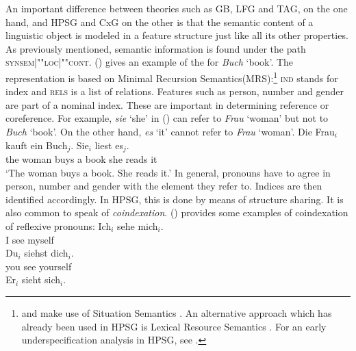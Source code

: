 An important difference between theories such as GB, LFG and TAG, on the one hand, and HPSG and CxG on the other is that the semantic content of a linguistic
object is modeled in a feature structure just like all its other properties. As previously mentioned, semantic information is found under the path
\textsc{synsem|""loc|""cont}. () gives an example of the \contv for \emph{Buch} `book'. The
representation is based on Minimal Recursion Semantics\indexmrs (MRS):\footnote{%
   \citet{ps2} and \citet{GSag2000a-u} make use of Situation Semantics  \citep*{BP83a,CMP90,Devlin92}\nocite{BP87a}.
   An alternative approach which has already been used in HPSG is Lexical Resource Semantics \citep{RS2004a-u}.
   For an early underspecification analysis in HPSG, see .
}
\ea
\label{le-buch}
\z
\textsc{ind} stands for index and \textsc{rels} is a list of relations. Features such as person, number and
gender are part of a nominal index. These are important
in determining reference or coreference.
For example, \emph{sie} `she' in () can refer to \emph{Frau} `woman' but not to \emph{Buch} `book'. On the other hand, \emph{es} 
`it' cannot refer to \emph{Frau} `woman'.
\ea
\gll Die Frau$_i$ kauft ein Buch$_j$. Sie$_i$ liest es$_j$.\\
	 the woman buys a book she reads it\\
\glt `The woman buys a book. She reads it.'
\z
\addlines
In general, pronouns have to agree in person, number and gender with the element they refer to. Indices are then identified accordingly.
In HPSG, this is done by means of structure sharing. It is also common to speak of \textit{coindexation}.
() provides some examples of coindexation of reflexive pronouns:
\eal
\ex
\gll Ich$_i$ sehe mich$_i$.\\
     I see myself\\
\ex 
\gll Du$_i$ siehst dich$_i$.\\
     you see yourself\\
\ex 
\gll Er$_i$ sieht sich$_i$.\\
